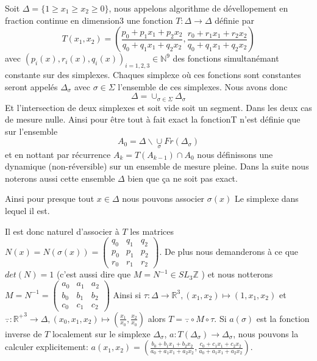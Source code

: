 Soit $\Delta=\{ 1 \geq x_1 \geq x_2 \geq 0 \}$, nous appelons algorithme de dévellopement en fraction continue en dimension3 une fonction $T:\Delta \to \Delta$ définie par \[ T(x_1,x_2)=(\frac{p_0+p_1 x_1+p_2 x_2}{q_0+q_1 x_1 +q_2 x_2},\frac{r_0+r_1 x_1+r_2 x_2}{q_0+q_1 x_1 +q_2 x_2}) \] avec $(p_i(x),r_i(x),q_i(x))_{i=1,2,3}\in \mathbb{N}^9$ des fonctions simultanémant constante sur des simplexes. Chaques simplexe où ces fonctions sont constantes seront appelés $\Delta_\sigma$ avec $\sigma \in \Sigma$ l'ensemble de ces simplexes. Nous avons donc
\[
\Delta = \cup_{\sigma \in \Sigma} \Delta_\sigma
\]
Et l'intersection de deux simplexes et soit vide soit un segment. Dans les deux cas de mesure nulle. Ainsi pour être tout à fait exact la fonctionT n'est définie que sur l'ensemble \[
A_0= \Delta \backslash \underset{\sigma}{\cup} Fr(\Delta_{\sigma})
\]
et en nottant par récurrence $A_k= T(A_{k-1}) \cap A_0 $ nous définissons une dynamique (non-réversible) sur un ensemble de mesure pleine. Dans la suite nous noterons aussi cette ensemble $\Delta$ bien que ça ne soit pas exact. \newline

Ainsi pour presque tout $x \in \Delta$ nous pouvons associer $\sigma(x)$ Le simplexe dans lequel il est.\newline

Il est donc naturel d'associer à $T$ les matrices $N(x)=N(\sigma(x))=\begin{pmatrix} q_0 & q_1 & q_2 \\ p_0 & p_1 & p_2 \\ r_0 & r_1 & r_2 \end{pmatrix}$. De plus nous demanderons à ce que $det(N)=1$ (c'est aussi dire que $M=N^{-1} \in SL_3{\mathbb{Z}}$ ) et nous notterons $M=N^{-1}=\begin{pmatrix} a_0 & a_1 & a_2 \\ b_0 & b_1 & b_2 \\ c_0 & c_1 & c_2 \end{pmatrix}$
\newline
Ainsi si $\tau: \Delta \to \mathbb{R}^3, (x_1,x_2) \mapsto (1,x_1,x_2)$ et $\overset{-}{.}: \mathbb{R^+}^3 \to \Delta,(x_0,x_1,x_2) \mapsto (\frac{x_1}{x_0},\frac{x_2}{x_0})$
alors $T=\overset{-}{.} \circ M \circ \tau$.\newline
Si $a(\sigma)$ est la fonction inverse de $T$ localement sur le simplexe $\Delta_{\sigma}$, $a:T(\Delta_\sigma) \to \Delta_\sigma$, nous pouvons la calculer explicitement: $a(x_1,x_2)=(\frac{b_0+b_1 x_1 + b_2 x_2}{a_0 + a_1 x_1 + a_2 x_2},\frac{c_0 + c_1 x_1 + c_2 x_2}{a_0 + a_1 x_1 + a_2 x_2})$.\newline

